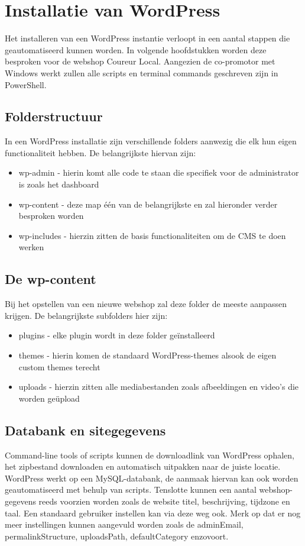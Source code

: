 \section{Installatie van WordPress}
Het installeren van een WordPress instantie verloopt in een aantal stappen die geautomatiseerd kunnen worden. In volgende hoofdstukken worden deze besproken voor de webshop Coureur Local. Aangezien de co-promotor met Windows werkt zullen alle scripts en terminal commands geschreven zijn in PowerShell.

\subsection{Folderstructuur}
In een WordPress installatie zijn verschillende folders aanwezig die elk hun eigen functionaliteit hebben. De belangrijkste hiervan zijn:
\begin{itemize}
    \item wp-admin - hierin komt alle code te staan die specifiek voor de administrator is zoals het dashboard
    \item wp-content - deze map één van de belangrijkste en zal hieronder verder besproken worden
    \item wp-includes - hierzin zitten de basis functionaliteiten om de CMS te doen werken
\end{itemize} 

\subsection{De wp-content}
Bij het opstellen van een nieuwe webshop zal deze folder de meeste aanpassen krijgen. De belangrijkste subfolders hier zijn:
\begin{itemize}
    \item plugins - elke plugin wordt in deze folder geïnstalleerd
    \item themes - hierin komen de standaard WordPress-themes alsook de eigen custom themes terecht
    \item uploads - hierzin zitten alle mediabestanden zoals afbeeldingen en video's die worden geüpload 
\end{itemize} 

\subsection{Databank en sitegegevens}
Command-line tools of scripts kunnen de downloadlink van WordPress ophalen, het zipbestand downloaden en automatisch uitpakken naar de juiste locatie. WordPress werkt op een MySQL-databank, de aanmaak hiervan kan ook worden geautomatiseerd met behulp van scripts. Tenslotte kunnen een aantal webshop-gegevens reeds voorzien worden zoals de website titel, beschrijving, tijdzone en taal. Een standaard gebruiker instellen kan via deze weg ook. Merk op dat er nog meer instellingen kunnen aangevuld worden zoals de adminEmail, permalinkStructure, uploadsPath, defaultCategory enzovoort.

